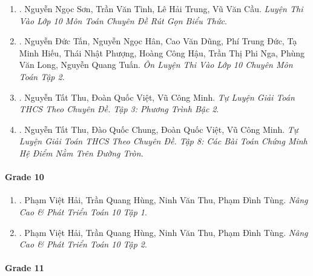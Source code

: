 \documentclass{article}
\begin{document}
\begin{enumerate}
	\item \cite{Son_Tinh_Trung_Cau_rgbt}. Nguyễn Ngọc Sơn, Trần Văn Tình, Lê Hải Trung, Vũ Văn Cầu. {\it Luyện Thi Vào Lớp 10 Môn Toán Chuyên Đề Rút Gọn Biểu Thức}.\hfill{\sf[reading]}
	
	\item \cite{Tan_Han_Dung_Duc_Hieu_Phuong_Hau_Nga_Long_Tuan_tap_2}. Nguyễn Đức Tấn, Nguyễn Ngọc Hân, Cao Văn Dũng, Phí Trung Đức, Tạ Minh Hiếu, Thái Nhật Phượng, Hoàng Công Hậu, Trần Thị Phi Nga, Phùng Văn Long, Nguyễn Quang Tuấn. {\it Ôn Luyện Thi Vào Lớp 10 Chuyên Môn Toán Tập 2}.
	
	\item \cite{Thu_Viet_Minh_ptb2}. Nguyễn Tất Thu, Đoàn Quốc Việt, Vũ Công Minh. {\it Tự Luyện Giải Toán THCS Theo Chuyên Đề. Tập 3: Phương Trình Bậc 2}.\hfill{\sf[done]}
	
	\item \cite{Thu_Chung_Viet_Minh_circ}. Nguyễn Tất Thu, Đào Quốc Chung, Đoàn Quốc Việt, Vũ Công Minh. {\it Tự Luyện Giải Toán THCS Theo Chuyên Đề. Tập 8: Các Bài Toán Chứng Minh Hệ Điểm Nằm Trên Đường Tròn}.\hfill{\sf[done]}
\end{enumerate}

\paragraph{Grade 10}

\begin{enumerate}
	\item \cite{Hai_Hung_Thu_Tung_ncpt_Toan_10_tap_1}. Phạm Việt Hải, Trần Quang Hùng, Ninh Văn Thu, Phạm Đình Tùng. {\it Nâng Cao \& Phát Triển Toán 10 Tập 1}.
	
	\item \cite{Hai_Hung_Thu_Tung_ncpt_Toan_10_tap_2}. Phạm Việt Hải, Trần Quang Hùng, Ninh Văn Thu, Phạm Đình Tùng. {\it Nâng Cao \& Phát Triển Toán 10 Tập 2}.
\end{enumerate}

\paragraph{Grade 11}
\end{document}
